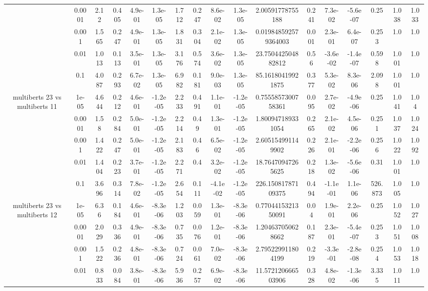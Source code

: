 \begin{tabular}{|c|c|c|c|c|c|c|c|c|c|c|c|c|c|c|c|c|}
 & 0.0001 & 2.12 & 0.405 & 4.9e-01 & 1.3e-05 & 1.712 & 0.247 & 8.6e-02 & 1.3e-05 & 2.00591778755188 & 0.241 & 7.3e-02 & -5.6e-07 & 0.25 & 1.038 & 1.033 \\
 & 0.001 & 1.565 & 0.247 & 4.9e-01 & 1.3e-05 & 1.831 & 0.304 & 2.1e-02 & 1.3e-05 & 0.019848592579364003 & 0.001 & 2.3e-01 & 6.4e-07 & 0.253 & 1.0 & 1.0 \\
 & 0.01 & 1.013 & 0.113 & 3.5e-01 & 1.3e-05 & 3.176 & 0.574 & 3.6e-02 & 1.3e-05 & 23.750442504882812 & 0.56 & -3.6e-02 & -1.4e-07 & 0.598 & 1.001 & 1.0 \\
 & 0.1 & 4.087 & 0.293 & 6.7e-02 & 1.3e-05 & 6.982 & 0.181 & 9.0e-03 & 1.3e-05 & 85.16180419921875 & 0.377 & 5.3e-02 & 8.3e-06 & 2.098 & 1.001 & 1.0 \\
\hline
\multirow{5}{*}{multiberts 23 vs multiberts 11} & 1e-05 & 4.644 & 0.212 & 4.6e-01 & -1.2e-05 & 2.233 & 0.491 & 1.1e-01 & -1.2e-05 & 0.7555857300758361 & 0.095 & 2.7e-02 & -4.9e-06 & 0.25 & 1.041 & 1.04 \\
 & 0.0001 & 1.58 & 0.284 & 5.0e-01 & -1.2e-05 & 2.214 & 0.49 & 1.3e-01 & -1.2e-05 & 1.800947189331054 & 0.265 & 2.1e-02 & 4.5e-06 & 0.251 & 1.037 & 1.024 \\
 & 0.001 & 1.422 & 0.247 & 5.0e-01 & -1.2e-05 & 2.183 & 0.46 & 6.5e-02 & -1.2e-05 & 2.605154991149902 & 0.226 & 2.1e-01 & -2.2e-06 & 0.256 & 1.022 & 1.092 \\
 & 0.01 & 1.404 & 0.223 & 3.7e-01 & -1.2e-05 & 2.271 & 0.4 & 3.2e-02 & -1.2e-05 & 18.76470947265625 & 0.218 & 1.3e-02 & -5.6e-06 & 0.31 & 1.001 & 1.0 \\
 & 0.1 & 3.696 & 0.314 & 7.8e-02 & -1.2e-05 & 2.654 & 0.111 & -4.1e-02 & -1.2e-05 & 226.15081787109375 & 0.494 & -1.1e-01 & 1.1e-06 & 526.873 & 1.005 & 1.0 \\
\hline
\multirow{5}{*}{multiberts 23 vs multiberts 12} & 1e-05 & 6.36 & 0.184 & 4.6e-01 & -8.3e-06 & 1.203 & 0.059 & 1.3e-01 & -8.3e-06 & 0.7704415321350091 & 0.04 & 1.9e-01 & 2.2e-06 & 0.25 & 1.052 & 1.027 \\
 & 0.0001 & 2.029 & 0.336 & 4.9e-01 & -8.3e-06 & 0.735 & 0.076 & 1.2e-01 & -8.3e-06 & 1.204637050628662 & 0.187 & 2.3e-01 & -5.4e-07 & 0.253 & 1.051 & 1.008 \\
 & 0.001 & 1.522 & 0.236 & 4.8e-01 & -8.3e-06 & 0.724 & 0.061 & 7.0e-02 & -8.3e-06 & 2.795229911804199 & 0.219 & -3.3e-01 & -2.8e-08 & 0.254 & 1.053 & 1.018 \\
 & 0.01 & 0.833 & 0.084 & 3.8e-01 & -8.3e-06 & 5.936 & 0.257 & 6.9e-02 & -8.3e-06 & 11.572120666503906 & 0.328 & 4.8e-02 & -1.3e-06 & 3.335 & 1.011 & 1.0 \\

\end{tabular}
